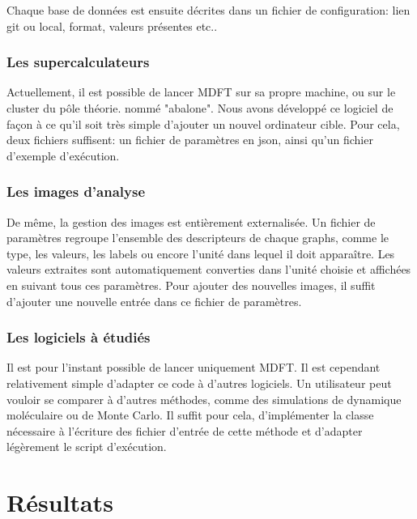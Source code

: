 Chaque base de données est ensuite décrites dans un fichier de configuration: lien git ou local, format, valeurs présentes etc..

\subsubsection{Les supercalculateurs}
Actuellement, il est possible de lancer MDFT sur sa propre machine, ou sur le cluster du pôle théorie. nommé "abalone". Nous avons développé ce logiciel de façon à ce qu'il soit très simple d'ajouter un nouvel ordinateur cible. Pour cela, deux fichiers suffisent: un fichier de paramètres en json, ainsi qu'un fichier d'exemple d’exécution.

\subsubsection{Les images d'analyse}
De même, la gestion des images est entièrement externalisée. Un fichier de paramètres regroupe l'ensemble des descripteurs de chaque graphs, comme le type, les valeurs, les labels ou encore l'unité dans lequel il doit apparaître. Les valeurs extraites sont automatiquement converties dans l'unité choisie et affichées en suivant tous ces paramètres. Pour ajouter des nouvelles images, il suffit d'ajouter une nouvelle entrée dans ce fichier de paramètres.

\subsubsection{Les logiciels à étudiés}
Il est pour l'instant possible de lancer uniquement MDFT. Il est cependant relativement simple d'adapter ce code à d'autres logiciels. Un utilisateur peut vouloir se comparer à d'autres méthodes, comme des simulations de dynamique moléculaire ou de Monte Carlo. Il suffit pour cela, d'implémenter la classe nécessaire à l'écriture des fichier d'entrée de cette méthode et d'adapter légèrement le script d’exécution.




\section{Résultats}
